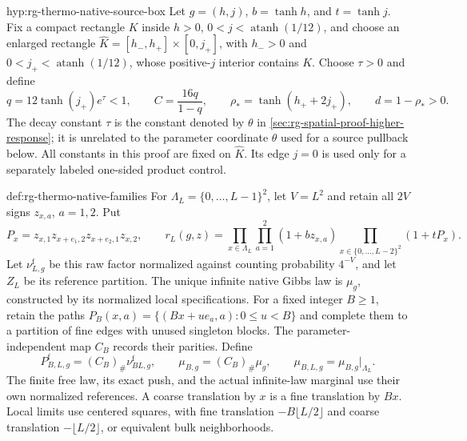 {hyp:rg-thermo-native-source-box}
Let \(g=(h,j)\), \(b=\tanh h\), and \(t=\tanh j\). Fix a compact
rectangle \(K\) inside
\(h>0\), \(0<j<\operatorname{atanh}(1/12)\), and choose an enlarged
rectangle
\(\widehat K=[h_-,h_+]\times[0,j_+]\), with \(h_->0\) and
\(0<j_+<\operatorname{atanh}(1/12)\), whose positive-\(j\) interior
contains \(K\). Choose \(\tau>0\) and define
\begin{equation}
 q=12\tanh(j_+)e^\tau<1,\qquad
 C=\frac{16q}{1-q},\qquad
 \rho_* =\tanh(h_++2j_+),\qquad d=1-\rho_*>0.
 \label{eq:rg-thermo-native-compact-constants}
\end{equation}
The decay constant \(\tau\) is the constant denoted by \(\theta\) in
\cref{sec:rg-spatial-proof-higher-response}; it is unrelated to the
parameter coordinate \(\theta\) used for a source pullback below. All
constants in this proof are fixed on \(\widehat K\). Its edge \(j=0\)
is used only for a separately labeled one-sided product control.\thermoadoptedhypothesis


{def:rg-thermo-native-families}
For \(\Lambda_L=\{0,\ldots,L-1\}^2\), let \(V=L^2\) and retain all
\(2V\) signs \(z_{x,a}\), \(a=1,2\). Put
\begin{equation}
 P_x=z_{x,1}z_{x+e_1,2}z_{x+e_2,1}z_{x,2},\qquad
 r_L(g,z)=\prod_{x\in\Lambda_L}\prod_{a=1}^2(1+bz_{x,a})
          \prod_{x\in\{0,\ldots,L-2\}^2}(1+tP_x).
 \label{eq:rg-thermo-native-free-factor}
\end{equation}
Let \(\nu_{L,g}^{\mathrm f}\) be this raw factor normalized against
counting probability \(4^{-V}\), and let \(Z_L\) be its reference
partition. The unique infinite native Gibbs law is \(\mu_g\), constructed
by its normalized local specifications. For a fixed integer \(B\ge1\),
retain the paths
\(P_B(x,a)=\{(Bx+u e_a,a):0\le u<B\}\) and complete them to a
partition of fine edges with unused singleton blocks. The parameter-independent
map \(C_B\) records their parities. Define
\begin{equation}
 P^{\mathrm f}_{B,L,g}=(C_B)_\#\nu^{\mathrm f}_{BL,g},\qquad
 \mu_{B,g}=(C_B)_\#\mu_g,\qquad
 \mu_{B,L,g}=\mu_{B,g}|_{\Lambda_L}.
 \label{eq:rg-thermo-native-three-families}
\end{equation}
The finite free law, its exact push, and the actual infinite-law marginal
use their own normalized references. A coarse translation by \(x\) is a
fine translation by \(Bx\). Local limits use centered squares, with fine
translation \(-B\lfloor L/2\rfloor\) and coarse translation
\(-\lfloor L/2\rfloor\), or equivalent bulk neighborhoods.

